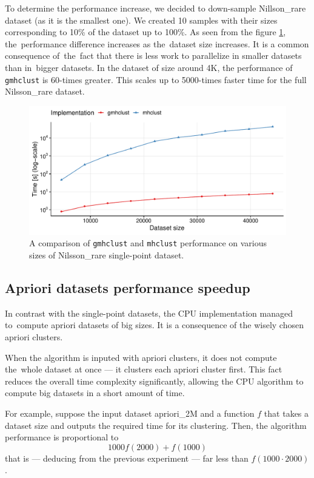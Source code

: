 To determine the performance increase, we decided to down-sample Nillson\_rare dataset (as it is the smallest one). We created 10 samples with their sizes corresponding to 10\% of the dataset up to 100\%.
As seen from the figure \ref{fig04:single_perf}, the~performance difference increases as the~dataset size increases. It is a common consequence of~the~fact that there is less work to parallelize in smaller datasets than in~bigger datasets. In the dataset of size around 4K, the performance of \texttt{gmhclust} is 60-times greater. This scales up to 5000-times faster time for the full Nilsson\_rare dataset.

\begin{figure}\centering
	\includegraphics[width=\linewidth]{img/single_perf_comp}
	\caption{A comparison of \texttt{gmhclust} and \texttt{mhclust} performance on various sizes of Nilsson\_rare single-point dataset.}
	\label{fig04:single_perf}
\end{figure}

\subsection{Apriori datasets performance speedup}

In contrast with the single-point datasets, the CPU implementation managed to~compute apriori datasets of big sizes. It is a consequence of the wisely chosen apriori clusters.

When the algorithm is inputed with apriori clusters, it does not compute the~whole dataset at once --- it clusters each apriori cluster first. This fact reduces the overall time complexity significantly, allowing the CPU algorithm to compute big datasets in a short amount of time.

For example, suppose the input dataset apriori\_2M and a function $f$ that takes a dataset size and outputs the required time for its clustering. Then, the algorithm performance is proportional to $$1000f(2000)+f(1000)$$ that is --- deducing from the previous experiment --- far less than $f(1000\cdot 2000)$.


